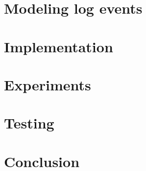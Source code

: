\chapter{Modeling log events}
\label{chap:modeling}


\chapter{Implementation}
\label{chap:implementation}


\chapter{Experiments}
\label{chap:experiments}


\chapter{Testing}
\label{chap:testing}


\chapter{Conclusion}
\label{chap:conclusion}
